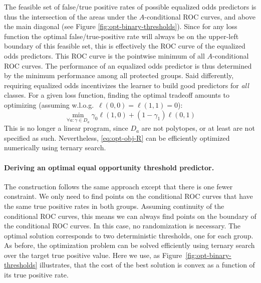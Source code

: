 The feasible set of false/true positive rates of possible equalized
odds predictors is thus the intersection of the areas under the
$A$-conditional ROC curves, and above the main diagonal (see Figure
\ref{fig:opt-binary-thresholds}).  Since for any loss function the optimal
false/true-positive rate will always be on the upper-left boundary of
this feasible set, this is effectively the ROC curve of the equalized odds
predictors.  This ROC curve is the pointwise minimum of all $A$-conditional
ROC curves.  The performance of an equalized odds predictor is thus
determined by the minimum performance among all protected groups.
Said differently, requiring equalized odds incentivizes the learner to
build good predictors for {\em all} classes.
%
For a given loss function, finding the optimal tradeoff amounts to
optimizing (assuming w.l.o.g.~$\ell(0,0)=\ell(1,1)=0$):
\begin{equation}
  \label{eq:opt-obj-R}
  \min_{\forall a\colon \gamma\in D_a} \gamma_0\ell(1,0)+(1-\gamma_1)\ell(0,1)
\end{equation}
This is no longer a linear program, since $D_a$ are not polytopes, or
at least are not specified as such.  Nevertheless,
\eqref{eq:opt-obj-R} can be efficiently optimized numerically using
ternary search.

\paragraph{Deriving an optimal equal opportunity threshold predictor.}
The construction follows the same approach except that there is one fewer constraint.
We only need to find points on the conditional ROC curves that have the same
true positive rates in both groups. Assuming continuity of the conditional ROC
curves, this means we can always find points on the boundary of the
conditional ROC curves. In this case, no randomization is necessary. The
optimal solution corresponds to two deterministic thresholds, one for each
group. As before, the optimization problem can be solved efficiently using
ternary search over the target true positive value. Here we use, as
Figure~\ref{fig:opt-binary-thresholds} illustrates, that the cost of the best
solution is convex as a function of its true positive rate.

